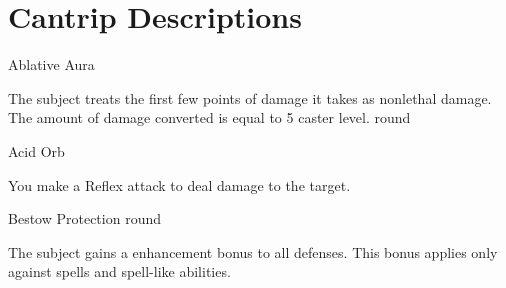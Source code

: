 \section{Cantrip Descriptions}

\begin{spellsection}{Ablative Aura}
    \begin{spellheader}
    \end{spellheader}
    \begin{spellcontent}
        \begin{spelltargetinginfo}
        \end{spelltargetinginfo}
        \begin{spelleffects}
            \spelleffect The subject treats the first few points of damage it takes as nonlethal damage. The amount of damage converted is equal to 5 \add caster level.
             round
        \end{spelleffects}
    \end{spellcontent}
    \begin{spellfooter}
    \end{spellfooter}
\end{spellsection}

\begin{spellsection}{Acid Orb}
    \begin{spelleffect}
        You make a Reflex attack to deal damage to the target.
    \end{spelleffect}
\end{spellsection}

\begin{spellsection}{Bestow Protection}
     round
    \begin{spelleffect}
        The subject gains a  enhancement bonus to all defenses. \bonusscalingdescription This bonus applies only against spells and spell-like abilities.
    \end{spelleffect}
\end{spellsection}

